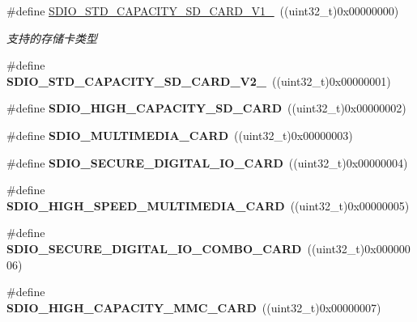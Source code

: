 \begin{DoxyCompactItemize}
\item 
\#define \hyperlink{group__sd__card_gaa713e311ddfaf2265d1ba673543a32b2}{S\+D\+I\+O\+\_\+\+S\+T\+D\+\_\+\+C\+A\+P\+A\+C\+I\+T\+Y\+\_\+\+S\+D\+\_\+\+C\+A\+R\+D\+\_\+\+V1\+\_}~((uint32\+\_\+t)0x00000000)\hypertarget{group__sd__card_gaa713e311ddfaf2265d1ba673543a32b2}{}\label{group__sd__card_gaa713e311ddfaf2265d1ba673543a32b2}

\begin{DoxyCompactList}\small\item\em 支持的存储卡类型 \end{DoxyCompactList}\item 
\#define {\bfseries S\+D\+I\+O\+\_\+\+S\+T\+D\+\_\+\+C\+A\+P\+A\+C\+I\+T\+Y\+\_\+\+S\+D\+\_\+\+C\+A\+R\+D\+\_\+\+V2\+\_}~((uint32\+\_\+t)0x00000001)\hypertarget{group__sd__card_ga9e67ed9afb202bc0d2993e17ce940b0d}{}\label{group__sd__card_ga9e67ed9afb202bc0d2993e17ce940b0d}

\item 
\#define {\bfseries S\+D\+I\+O\+\_\+\+H\+I\+G\+H\+\_\+\+C\+A\+P\+A\+C\+I\+T\+Y\+\_\+\+S\+D\+\_\+\+C\+A\+RD}~((uint32\+\_\+t)0x00000002)\hypertarget{group__sd__card_gac99ee44931ecbf64e04623c442c00916}{}\label{group__sd__card_gac99ee44931ecbf64e04623c442c00916}

\item 
\#define {\bfseries S\+D\+I\+O\+\_\+\+M\+U\+L\+T\+I\+M\+E\+D\+I\+A\+\_\+\+C\+A\+RD}~((uint32\+\_\+t)0x00000003)\hypertarget{group__sd__card_ga857bc50f4f97f7f5f525da94db9b2774}{}\label{group__sd__card_ga857bc50f4f97f7f5f525da94db9b2774}

\item 
\#define {\bfseries S\+D\+I\+O\+\_\+\+S\+E\+C\+U\+R\+E\+\_\+\+D\+I\+G\+I\+T\+A\+L\+\_\+\+I\+O\+\_\+\+C\+A\+RD}~((uint32\+\_\+t)0x00000004)\hypertarget{group__sd__card_ga2a0f3bb0a673de7c62c071865307a36e}{}\label{group__sd__card_ga2a0f3bb0a673de7c62c071865307a36e}

\item 
\#define {\bfseries S\+D\+I\+O\+\_\+\+H\+I\+G\+H\+\_\+\+S\+P\+E\+E\+D\+\_\+\+M\+U\+L\+T\+I\+M\+E\+D\+I\+A\+\_\+\+C\+A\+RD}~((uint32\+\_\+t)0x00000005)\hypertarget{group__sd__card_ga202a3247319d79b72bd2968761b75144}{}\label{group__sd__card_ga202a3247319d79b72bd2968761b75144}

\item 
\#define {\bfseries S\+D\+I\+O\+\_\+\+S\+E\+C\+U\+R\+E\+\_\+\+D\+I\+G\+I\+T\+A\+L\+\_\+\+I\+O\+\_\+\+C\+O\+M\+B\+O\+\_\+\+C\+A\+RD}~((uint32\+\_\+t)0x00000006)\hypertarget{group__sd__card_ga63b1da6dd1a51131f3b53f1fbfb41ae3}{}\label{group__sd__card_ga63b1da6dd1a51131f3b53f1fbfb41ae3}

\item 
\#define {\bfseries S\+D\+I\+O\+\_\+\+H\+I\+G\+H\+\_\+\+C\+A\+P\+A\+C\+I\+T\+Y\+\_\+\+M\+M\+C\+\_\+\+C\+A\+RD}~((uint32\+\_\+t)0x00000007)\hypertarget{group__sd__card_ga1551b2950a3d0c5fa148957b4f169d0d}{}\label{group__sd__card_ga1551b2950a3d0c5fa148957b4f169d0d}

\end{DoxyCompactItemize}

